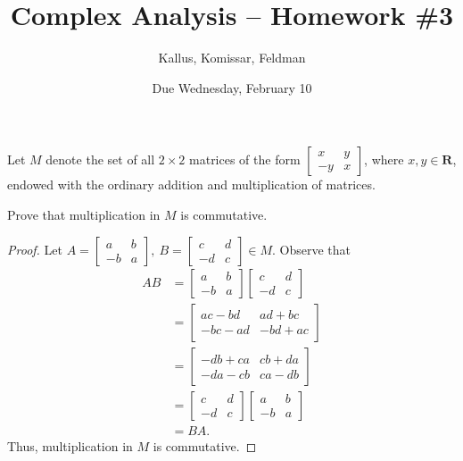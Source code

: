 \documentclass[11pt]{article}       %
\title{Complex Analysis -- Homework \#3}
\author{ Kallus, Komissar, Feldman }
\date{ Due Wednesday, February 10 }
\theoremstyle{definition}
\begin{document}
\pagecolor{black}
\color{white}
\maketitle

 Let  $M$  denote the set of all  $2 \times 2$  matrices of the form
$\begin{bmatrix} x & y \\ -y & x \end{bmatrix}$, where  $x,y \in \mathbf R$, endowed with the ordinary addition and multiplication of matrices.

\medskip
{} Prove that multiplication in $M$ is commutative. 
\begin{proof}
    Let $A = \begin{bmatrix} a & b \\ -b & a \end{bmatrix},~B = \begin{bmatrix} c & d \\ -d & c \end{bmatrix} \in M$.
    Observe that
    \begin{align*}
        AB &= \begin{bmatrix} a & b \\ -b & a \end{bmatrix} \begin{bmatrix} c & d \\ -d & c \end{bmatrix} \\
           &= \begin{bmatrix} ac -bd & ad + bc \\ -bc - ad  & -bd + ac \end{bmatrix} \\
           &= \begin{bmatrix} -db + ca & cb + da \\ -da - cb  & ca - db \end{bmatrix} \\
           &= \begin{bmatrix} c & d \\ -d & c \end{bmatrix} \begin{bmatrix} a & b \\ -b & a \end{bmatrix} \\
           &= BA.
    \end{align*} Thus, multiplication in $M$ is commutative.
\end{proof}
\end{document}
